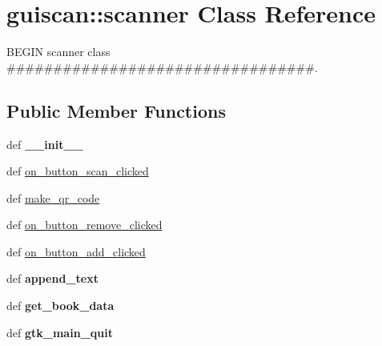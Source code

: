 \hypertarget{classguiscan_1_1scanner}{
\section{guiscan::scanner Class Reference}
\label{classguiscan_1_1scanner}
}


BEGIN scanner class \#\#\#\#\#\#\#\#\#\#\#\#\#\#\#\#\#\#\#\#\#\#\#\#\#\#\#\#\#\#\#\#\#.  


\subsection*{Public Member Functions}
\begin{DoxyCompactItemize}
\item 
\hypertarget{classguiscan_1_1scanner_a24bf6dd8edd117579f128998757654a0}{
def {\bfseries \_\-\_\-init\_\-\_\-}}
\label{classguiscan_1_1scanner_a24bf6dd8edd117579f128998757654a0}

\item 
def \hyperlink{classguiscan_1_1scanner_a3985b7e8a7c583f1855ffefb09f614dd}{on\_\-button\_\-scan\_\-clicked}
\item 
def \hyperlink{classguiscan_1_1scanner_a99a34b9d6414b7e32662581b02a703a2}{make\_\-qr\_\-code}
\item 
def \hyperlink{classguiscan_1_1scanner_aed3d81af22db6558f5039b08209667cb}{on\_\-button\_\-remove\_\-clicked}
\item 
def \hyperlink{classguiscan_1_1scanner_af48fc927b531df3991648cbca7ba715a}{on\_\-button\_\-add\_\-clicked}
\item 
\hypertarget{classguiscan_1_1scanner_ac7fb4a3b65f7f4cb165dd5700d31c128}{
def {\bfseries append\_\-text}}
\label{classguiscan_1_1scanner_ac7fb4a3b65f7f4cb165dd5700d31c128}

\item 
\hypertarget{classguiscan_1_1scanner_a01865857f839cf3e5bcd8f8b74bd418e}{
def {\bfseries get\_\-book\_\-data}}
\label{classguiscan_1_1scanner_a01865857f839cf3e5bcd8f8b74bd418e}

\item 
\hypertarget{classguiscan_1_1scanner_af8dad2898aba6607bf75b6a5fcf18249}{
def {\bfseries gtk\_\-main\_\-quit}}
\label{classguiscan_1_1scanner_af8dad2898aba6607bf75b6a5fcf18249}

\end{DoxyCompactItemize}
